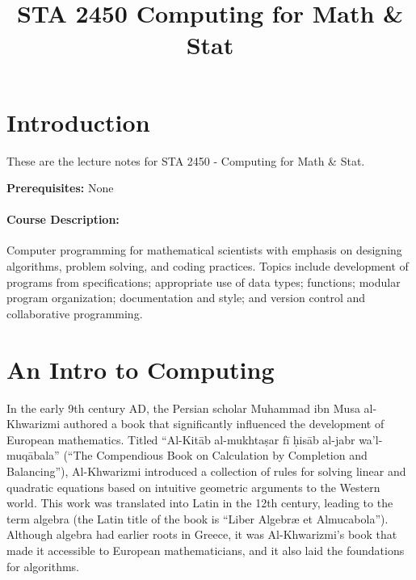 \documentclass[
  letterpaper,
  DIV=11,
  numbers=noendperiod]{scrreprt}
\title{STA 2450 Computing for Math \& Stat}
\author{}
\date{}
\renewcommand*\contentsname{Table of contents}
\newcommand\contentsname{Table of contents}
\begin{document}
\maketitle
\ifdefined\Shaded\renewenvironment{Shaded}{\begin{tcolorbox}[boxrule=0pt, interior hidden, enhanced, frame hidden, sharp corners, borderline west={3pt}{0pt}{shadecolor}, breakable]}{\end{tcolorbox}}\fi

\renewcommand*\contentsname{Table of contents}
{
\hypersetup{linkcolor=}
\setcounter{tocdepth}{2}
\tableofcontents
}

\hypertarget{introduction}{%
\chapter*{Introduction}\label{introduction}}


These are the lecture notes for STA 2450 - Computing for Math \& Stat.

\textbf{Prerequisites:} None

\hypertarget{course-description}{%
\subsubsection*{Course Description:}\label{course-description}}

Computer programming for mathematical scientists with emphasis on
designing algorithms, problem solving, and coding practices. Topics
include development of programs from specifications; appropriate use of
data types; functions; modular program organization; documentation and
style; and version control and collaborative programming.


\hypertarget{an-intro-to-computing}{%
\chapter{An Intro to Computing}\label{an-intro-to-computing}}

In the early 9th century AD, the Persian scholar Muhammad ibn Musa
al-Khwarizmi authored a book that significantly influenced the
development of European mathematics. Titled ``Al-Kitāb al-mukhtaṣar fī
ḥisāb al-jabr wa'l-muqābala'' (``The Compendious Book on Calculation by
Completion and Balancing''), Al-Khwarizmi introduced a collection of
rules for solving linear and quadratic equations based on intuitive
geometric arguments to the Western world. This work was translated into
Latin in the 12th century, leading to the term algebra (the Latin title
of the book is ``Liber Algebræ et Almucabola''). Although algebra had
earlier roots in Greece, it was Al-Khwarizmi's book that made it
accessible to European mathematicians, and it also laid the foundations
for algorithms.
\end{document}
